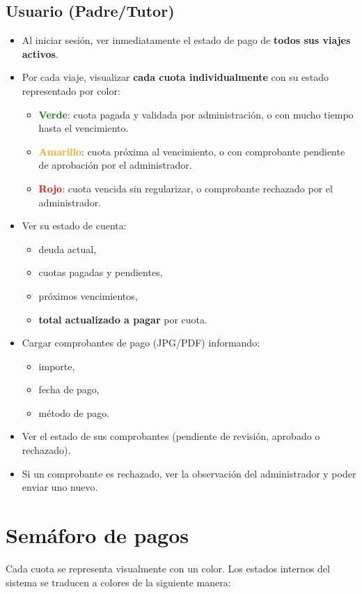 \documentclass[12pt,a4paper]{article}
\begin{document}
\subsection{Usuario (Padre/Tutor)}
\begin{itemize}[leftmargin=*]
    \item Al iniciar sesión, ver inmediatamente el estado de pago de \textbf{todos sus viajes activos}.
    \item Por cada viaje, visualizar \textbf{cada cuota individualmente} con su estado representado por color:
    \begin{itemize}
        \item \textcolor{green}{\textbf{Verde}}: cuota pagada y validada por administración, o con mucho tiempo hasta el vencimiento.
        \item \textcolor{orange}{\textbf{Amarillo}}: cuota próxima al vencimiento, o con comprobante pendiente de aprobación por el administrador.
        \item \textcolor{red}{\textbf{Rojo}}: cuota vencida sin regularizar, o comprobante rechazado por el administrador.
    \end{itemize}
    \item Ver su estado de cuenta:
    \begin{itemize}
        \item deuda actual,
        \item cuotas pagadas y pendientes,
        \item próximos vencimientos,
        \item \textbf{total actualizado a pagar} por cuota.
    \end{itemize}
    \item Cargar comprobantes de pago (JPG/PDF) informando:
    \begin{itemize}
        \item importe,
        \item fecha de pago,
        \item método de pago.
    \end{itemize}
    \item Ver el estado de sus comprobantes (pendiente de revisión, aprobado o rechazado).
    \item Si un comprobante es rechazado, ver la observación del administrador y poder enviar uno nuevo.
\end{itemize}

\section{Semáforo de pagos}
Cada cuota se representa visualmente con un color. Los estados internos del sistema se traducen a colores de la siguiente manera:
\end{document}
